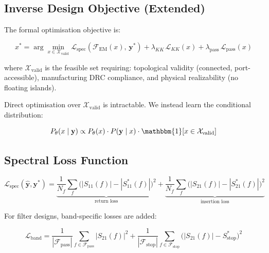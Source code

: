 \documentclass[12pt,a4paper]{article}
\newcommand{\FEM}{\mathcal{F}_{\mathrm{EM}}}
\newcommand{\ystar}{\mathbf{y}^{*}}
\newcommand{\yhat}{\hat{\mathbf{y}}}
\theoremstyle{definition}
\theoremstyle{plain}
\theoremstyle{remark}
\begin{document}
\subsection{Inverse Design Objective (Extended)}
\label{sec:objective}

The formal optimisation objective is:

\begin{equation}
  x^* = \arg\min_{x \in \mathcal{X}_{\mathrm{valid}}}
    \mathcal{L}_{\mathrm{spec}}\!\left(\FEM(x),\, \ystar\right)
    + \lambda_{KK}\,\mathcal{L}_{KK}(x)
    + \lambda_{\mathrm{pass}}\,\mathcal{L}_{\mathrm{pass}}(x)
  \label{eq:objective}
\end{equation}

where $\mathcal{X}_{\mathrm{valid}}$ is the feasible set requiring:
topological validity (connected, port-accessible),
manufacturing DRC compliance, and physical realizability (no floating islands).

Direct optimisation over $\mathcal{X}_{\mathrm{valid}}$ is intractable.
We instead learn the conditional distribution:

\begin{equation}
  P_\theta(x \mid \mathbf{y})
    \propto P_\theta(x)\cdot P(\mathbf{y} \mid x)
    \cdot \mathbbm{1}[x \in \mathcal{X}_{\mathrm{valid}}]
  \label{eq:posterior}
\end{equation}

\subsection{Spectral Loss Function}

\begin{equation}
  \mathcal{L}_{\mathrm{spec}}(\yhat, \ystar)
  =
  \underbrace{
    \frac{1}{N_f}\sum_f \bigl(|S_{11}(f)| - |S_{11}^*(f)|\bigr)^2
  }_{\text{return loss}}
  +
  \underbrace{
    \frac{1}{N_f}\sum_f \bigl(|S_{21}(f)| - |S_{21}^*(f)|\bigr)^2
  }_{\text{insertion loss}}
  \label{eq:lspec}
\end{equation}

For filter designs, band-specific losses are added:

\begin{equation}
  \mathcal{L}_{\mathrm{band}}
  =
  \frac{1}{|\mathcal{F}_{\mathrm{pass}}|}\sum_{f \in \mathcal{F}_{\mathrm{pass}}}
    |S_{21}(f)|^2
  +
  \frac{1}{|\mathcal{F}_{\mathrm{stop}}|}\sum_{f \in \mathcal{F}_{\mathrm{stop}}}
    \bigl(|S_{21}(f)| - S_{\mathrm{stop}}^*\bigr)^2
  \label{eq:lband}
\end{equation}
\end{document}
